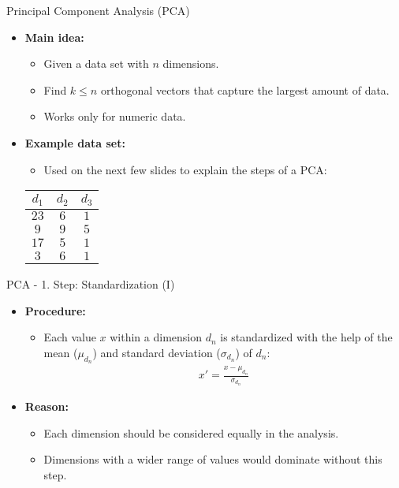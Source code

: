 \begin{frame}{Principal Component Analysis (PCA)}
	\begin{itemize}
		\item \textbf{Main idea:}
		      \begin{itemize}
			      \item Given a data set with $n$ dimensions.
			      \item Find $k \leq n$ orthogonal vectors that capture the largest
			            amount of data.
			      \item Works only for numeric data.
		      \end{itemize}
		\item \textbf{Example data set:}
		      \begin{itemize}
			      \item Used on the next few slides to explain the steps of a PCA:
		      \end{itemize}
		      \vspace{3mm}
		      \centering
		      \begin{tabular}{|c|c|c|}
			      \hline
			      $d_1$ & $d_2$ & $d_3$
			      \\\hline
			      $23$  & $6$   & $1$
			      \\\hline
			      $9$   & $9$   & $5$
			      \\\hline
			      $17$  & $5$   & $1$
			      \\\hline
			      $3$   & $6$   & $1$
			      \\\hline
		      \end{tabular}
	\end{itemize}
\end{frame}

\begin{frame}{PCA - 1. Step: Standardization (I)}
	\begin{itemize}
		\item \textbf{Procedure:}
		      \begin{itemize}
			      \item Each value $x$ within a dimension $d_n$ is standardized with
			            the help of the mean ($\mu_{d_n}$) and standard deviation
			            ($\sigma_{d_n}$) of $d_n$:
			            \begin{align*}
				            x' = \frac{x - \mu_{d_n}}{\sigma_{d_n}}
			            \end{align*}
		      \end{itemize}
		\item \textbf{Reason:}
		      \begin{itemize}
			      \item Each dimension should be considered equally in the analysis.
			      \item Dimensions with a wider range of	values would dominate
			            without this step.
		      \end{itemize}
	\end{itemize}
\end{frame}

